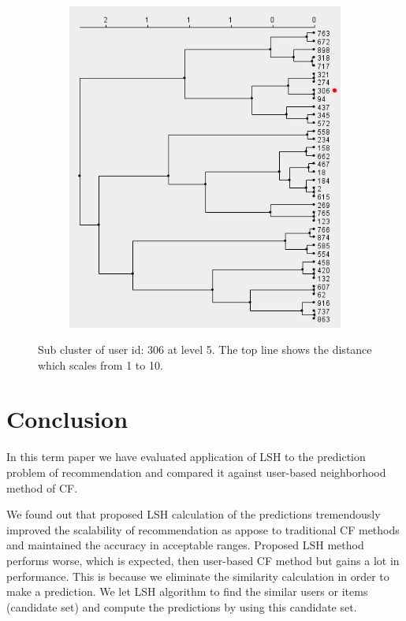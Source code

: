 \documentclass[conference]{IEEEtran}
\begin{document}
\begin{figure}[!h]
        \centering
        \begin{subfigure}[b]{0.50\textwidth}
                \includegraphics[width=\textwidth]{charts/cluster-user-306.jpg}
        \end{subfigure}
        \caption{Sub cluster of user id: 306 at level 5. The top line shows the distance which scales from 1 to 10.}
        \label{fig:sample-user-cluster}
\end{figure}


\section{Conclusion}
\label{sec:conclusion}

In this term paper we have evaluated application of LSH to the prediction 
problem of recommendation and compared it against user-based neighborhood 
method of CF. 

We found out that proposed LSH calculation of the predictions tremendously 
improved the scalability of recommendation as appose to traditional CF methods 
and maintained the accuracy in acceptable ranges. Proposed LSH method performs 
worse, which is expected, then user-based CF method but gains a lot in performance.
This is because we eliminate the similarity calculation in order to make a prediction. 
We let LSH algorithm to find the similar users or items (candidate set) and compute 
the predictions by using this candidate set.
\end{document}
